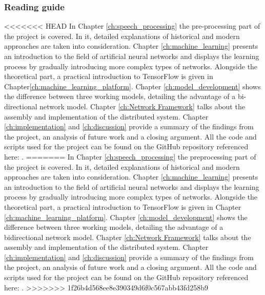 \subsubsection{Reading guide}
<<<<<<< HEAD
In Chapter \ref{ch:speech_processing} the pre-processing part of the project is covered. In it, detailed explanations of historical and modern approaches are taken into consideration. Chapter \ref{ch:machine_learning} presents an introduction to the field of artificial neural networks and displays the learning process by gradually introducing more complex types of networks. Alongside the theoretical part, a practical introduction to TensorFlow is given in Chapter\ref{ch:machine_learning_platform}. Chapter \ref{ch:model_development} shows the difference between three working models, detailing the advantage of a bi-directional network model. Chapter \ref{ch:Network Framework} talks about the assembly and implementation of the distributed system. Chapter \ref{ch:implementation} and \ref{ch:discussion} provide a summary of the findings from the project, an analysis of future work and a closing argument. All the code and scripts used for the project can be found on the GitHub repository referenced here: \cite{mavericks2017}.
=======
In Chapter \ref{ch:speech_processing} the preprocessing 
part of the project is covered. In it, detailed 
explanations of historical and modern approaches are 
taken into consideration.
Chapter \ref{ch:machine_learning} presents an 
introduction to the field of artificial neural networks 
and displays the learning process by gradually 
introducing more complex types of networks.
Alongside the theoretical part,
a practical introduction to TensorFlow is given
in Chapter \ref{ch:machine_learning_platform}.
Chapter \ref{ch:model_development} shows the
difference between three working models,
detailing the advantage of a bidirectional
network model. Chapter \ref{ch:Network Framework}
talks about the assembly and implementation of
the distributed system.
Chapter \ref{ch:implementation} and \ref{ch:discussion}
provide a summary of the findings from the project, an 
analysis of future work and a closing argument.
All the code and scripts used for the project can be 
found on the GitHub repository referenced here: \cite{mavericks2017}.
>>>>>>> 1f26b4d568ee8e390349d6f0c567abb43fd258b9
